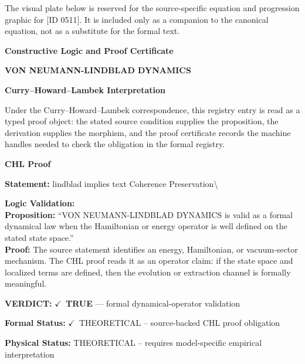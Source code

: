 \begingroup\footnotesize\sloppy
The visual plate below is reserved for the source-specific equation and progression graphic for [ID 0511]. It is included only as a companion to the canonical equation, not as a substitute for the formal text.
\par\endgroup
\ifTZPDarkEdition
{}
\fi

\clearpage
\begingroup\tzpsupportsetup
\noindent\textbf{\fontsize{10.8pt}{12.8pt}\selectfont [ID 0511] Constructive Logic and Proof Certificate}\par
\noindent\textbf{\fontsize{10pt}{12pt}\selectfont VON NEUMANN-LINDBLAD DYNAMICS}\par
\vspace{0.45em}
\begingroup
\footnotesize
\setlength{\parskip}{0.22em}
\setlength{\parindent}{0pt}
\noindent\textbf{Curry--Howard--Lambek Interpretation}\par
Under the Curry--Howard--Lambek correspondence, this registry entry is read as a typed proof
object: the stated source condition supplies the proposition, the derivation supplies the
morphism, and the proof certificate records the machine handles needed to check the obligation
in the formal registry.

\vspace{0.45em}
\noindent\textbf{CHL Proof}\par
\textbf{Statement:} lindblad implies text Coherence Preservation\textbackslash{}

\textbf{Logic Validation:}\\
\textbf{Proposition:} ``VON NEUMANN-LINDBLAD DYNAMICS is valid as a formal dynamical law when the Hamiltonian or
energy operator is well defined on the stated state space.''\\
\textbf{Proof:} The source statement identifies an energy, Hamiltonian, or vacuum-sector mechanism. The
CHL proof reads it as an operator claim: if the state space and localized terms are
defined, then the evolution or extraction channel is formally meaningful.

\textbf{VERDICT:} \ensuremath{\checkmark}\ \textbf{TRUE} --- formal dynamical-operator validation

\textbf{Formal Status:} \ensuremath{\checkmark}\ THEORETICAL -- source-backed CHL proof obligation

\textbf{Physical Status:} THEORETICAL -- requires model-specific empirical interpretation
\par\vspace{0.45em}
\par
\ifTZPDarkEdition
{}
\fi
\endgroup
\endgroup
